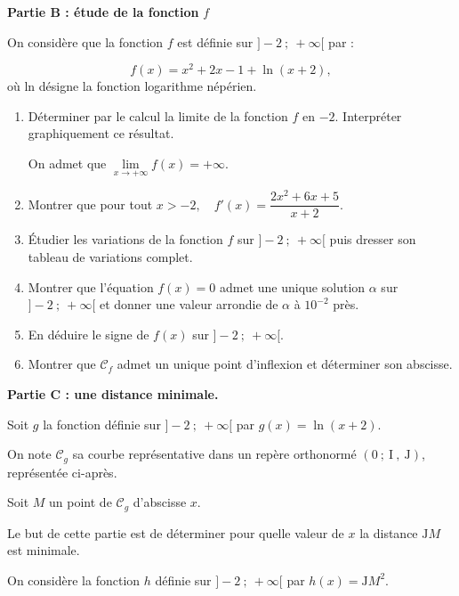 \medskip

\textbf{Partie B : étude de la fonction }\boldmath $f$ \unboldmath

\medskip

On considère que la fonction $f$ est définie sur $]-2 ~;~+\infty[$ par :

\[f(x) = x^{2}+ 2x - 1 + \ln (x + 2),\]
 où ln désigne la fonction logarithme népérien.

\begin{enumerate}
\item Déterminer par le calcul la limite de la fonction $f$ en $-2$. Interpréter graphiquement ce résultat.

On admet que $\lim\limits_{x  \to +\infty} f(x)=+\infty$.

\item Montrer que pour tout $x>-2, \quad f'(x)=\dfrac{2 x^{2}+6 x+5}{x+2}$.

\item Étudier les variations de la fonction $f$ sur $]-2 ~;~+\infty[$ puis dresser son tableau de variations complet.

\item Montrer que l'équation $f(x)=0$ admet une unique solution $\alpha$ sur $]-2 ~;~+\infty[$ et donner une valeur arrondie de $\alpha$ à $10^{-2}$ près.

\item En déduire le signe de $f(x)$ sur $]-2~;~ +\infty[$.

\item Montrer que $\mathcal{C}_{f}$ admet un unique point d'inflexion et déterminer son abscisse.

\end{enumerate}

\medskip

\textbf{Partie C : une distance minimale.}

\medskip
Soit $g$ la fonction définie sur $]-2 ~;~ +\infty[$ par \quad $g(x)=\ln (x+2)$.

On note $\mathcal{C}_{g}$ sa courbe représentative dans un repère orthonormé $(\mathrm{0} ~;~  \mathrm{I}~,~ \mathrm{J})$, représentée ci-après.

Soit $M$ un point de $\mathcal{C}_{g}$ d'abscisse $x$.

Le but de cette partie est de déterminer pour quelle valeur de $x$ la distance $\mathrm{J}M$ est minimale.

On considère la fonction $h$ définie sur $]-2 ~;~ +\infty[$ par \quad $h(x)=\mathrm{J}M^{2}$.

